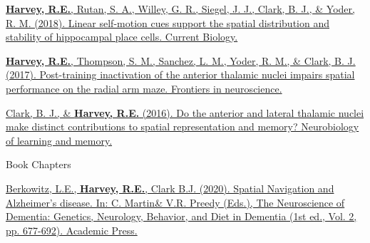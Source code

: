 \begin{cventries}
{\begin{cvitems}
            \item {\href{https://doi.org/10.1016/j.cub.2018.04.034}{\textbf{Harvey, R.E.}, Rutan, S. A., Willey, G. R., Siegel, J. J., Clark, B. J., \& Yoder, R. M. (2018). Linear self-motion cues support the spatial distribution and stability of hippocampal place cells. Current Biology.}}
            \item {\href{https://doi.org/10.3389/fnins.2017.00094}{\textbf{Harvey, R.E.}, Thompson, S. M., Sanchez, L. M., Yoder, R. M., \& Clark, B. J. (2017). Post-training inactivation of the anterior thalamic nuclei impairs spatial performance on the radial arm maze. Frontiers in neuroscience.}} 
            \item {\href{https://doi.org/10.1016/j.nlm.2016.06.002}{Clark, B. J., \& \textbf{Harvey, R.E.} (2016). Do the anterior and lateral thalamic nuclei make distinct contributions to spatial representation and memory? Neurobiology of learning and memory.}}
      \end{cvitems}
    }
    
\cventry
    {Book Chapters} %
    {} %
    {} %
    {} %
    {
      \begin{cvitems} %
      \setlength\itemsep{0.5em}
          \item {\href{https://doi.org/10.1016/B978-0-12-815868-5.00043-8}{Berkowitz, L.E., \textbf{Harvey, R.E.}, Clark B.J. (2020). Spatial Navigation and Alzheimer’s disease. In: C. Martin\& V.R. Preedy (Eds.), The Neuroscience of Dementia: Genetics, Neurology, Behavior, and Diet in Dementia (1st ed., Vol. 2, pp. 677-692). Academic Press.}}
      \end{cvitems}
    }
\end{cventries}